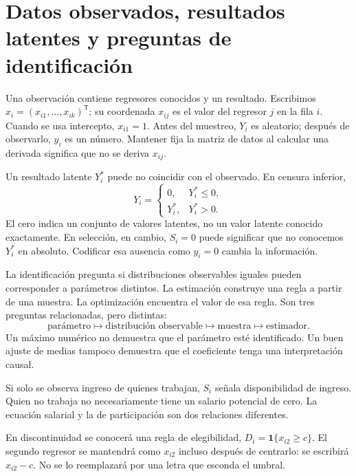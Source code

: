\documentclass[11pt,a4paper]{article}
\newcommand{\T}{^{\mathsf T}}
\begin{document}
\clearpage
{}
\section{Datos observados, resultados latentes y preguntas de identificación}\label{unidad1}
Una observación contiene regresores conocidos y un resultado.
Escribimos \(x_i=(x_{i1},\ldots,x_{ik})\T\); su coordenada
\(x_{ij}\) es el valor del regresor \(j\) en la fila \(i\).
Cuando se usa intercepto, \(x_{i1}=1\).
Antes del muestreo, \(Y_i\) es aleatorio; después de observarlo,
\(y_i\) es un número. Mantener fija la matriz de datos al
calcular una derivada significa que no se deriva \(x_{ij}\).

Un resultado latente \(Y_i^\ast\) puede no coincidir con
el observado. En censura inferior,
\[
Y_i=\begin{cases}0,&Y_i^\ast\le0,\\Y_i^\ast,&Y_i^\ast>0.\end{cases}
\]
El cero indica un conjunto de valores latentes, no un
valor latente conocido exactamente.
En selección, en cambio, \(S_i=0\) puede significar
que no conocemos \(Y_i^\ast\) en absoluto.
Codificar esa ausencia como \(y_i=0\) cambia la información.

La identificación pregunta si distribuciones observables
iguales pueden corresponder a parámetros distintos.
La estimación construye una regla a partir de una muestra.
La optimización encuentra el valor de esa regla.
Son tres preguntas relacionadas, pero distintas:
\[
\text{parámetro}\longmapsto
\text{distribución observable}\longmapsto
\text{muestra}\longmapsto\text{estimador}.
\]
Un máximo numérico no demuestra que el parámetro esté
identificado. Un buen ajuste de medias tampoco demuestra
que el coeficiente tenga una interpretación causal.

\begin{ejemplo}
Si solo se observa ingreso de quienes trabajan,
\(S_i\) señala disponibilidad de ingreso.
Quien no trabaja no necesariamente tiene un salario
potencial de cero. La ecuación salarial y la de
participación son dos relaciones diferentes.
\end{ejemplo}
En discontinuidad se conocerá una regla de elegibilidad,
\(D_i=\mathbf1\{x_{i2}\ge c\}\).
El segundo regresor se mantendrá como \(x_{i2}\)
incluso después de centrarlo: se escribirá \(x_{i2}-c\).
No se lo reemplazará por una letra que esconda el umbral.
\end{document}
